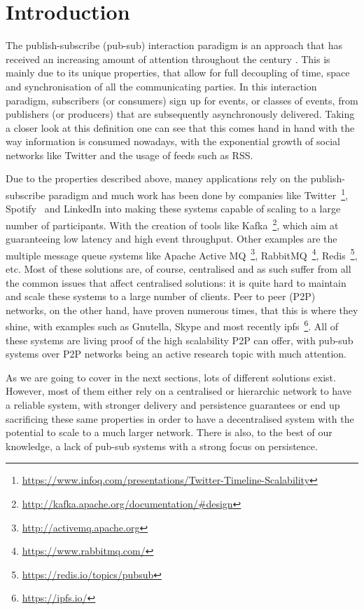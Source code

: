 
\section{Introduction}\label{section:introduction}


The publish-subscribe (pub-sub) interaction paradigm is an approach that has
received an increasing amount of attention throughout the century
\cite{Kermarrec2013} \cite{Eugster2003}. This is mainly due to its unique
properties, that allow for full decoupling of time, space and synchronisation
of all the communicating parties. In this interaction paradigm, subscribers (or
consumers) sign up for events, or classes of events, from publishers (or
producers) that are subsequently asynchronously delivered. Taking a closer look
at this definition one can see that this comes hand in hand with the way
information is consumed nowadays, with the exponential growth of social
networks like Twitter and the usage of feeds such as RSS.

Due to the properties described above, maney applications rely on the
publish-subscribe paradigm and much work has been done by companies like
Twitter~\footnote{\url{https://www.infoq.com/presentations/Twitter-Timeline-Scalability}},
Spotify~\cite{Setty2013} and LinkedIn into making these systems capable of
scaling to a large number of participants. With the creation of tools like
Kafka~\footnote{\url{http://kafka.apache.org/documentation/\#design}}, which
aim at guaranteeing low latency and high event throughput. Other examples are
the multiple message queue systems like Apache Active
MQ~\footnote{\url{http://activemq.apache.org}},
RabbitMQ~\footnote{\url{https://www.rabbitmq.com/}},
Redis~\footnote{\url{https://redis.io/topics/pubsub}}, etc. Most of these
solutions are, of course, centralised and as such suffer from all the common
issues that affect centralised solutions: it is quite hard to maintain and
scale these systems to a large number of clients. Peer to peer (P2P) networks,
on the other hand, have proven numerous times, that this is where they shine,
with examples such as Gnutella, Skype and most recently
ipfs~\footnote{\url{https://ipfs.io/}}. All of these systems are living proof
of the high scalability P2P can offer, with pub-sub systems over P2P networks
being an active research topic with much attention.

As we are going to cover in the next sections, lots of different solutions
exist. However, most of them either rely on a centralised or hierarchic network
to have a reliable system, with stronger delivery and persistence guarantees
or end up sacrificing these same properties in order to have a decentralised
system with the potential to scale to a much larger network. There is also, to
the best of our knowledge, a lack of pub-sub systems with a strong focus on
persistence.

